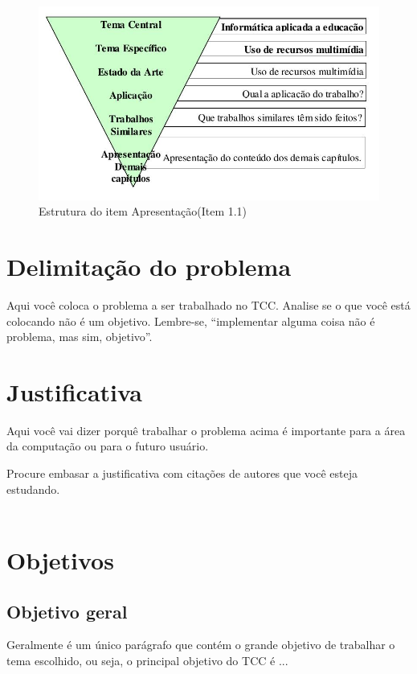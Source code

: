 \documentclass[pnumromarab, normaltoc, a4paper, 12pt]{abnt-unochapeco}
\begin{document}
\begin{figure}[hbtp]
  \begin{center}
  \caption{Estrutura do item Apresentação(Item 1.1)}
  \includegraphics[width=150mm]{images/imagem1.jpeg}
  \end{center}
\end{figure}

\section{Delimitação do problema}
Aqui você coloca o problema a ser trabalhado no TCC. Analise se o que você está
colocando não é um objetivo. Lembre-se, ``implementar alguma coisa não é
problema, mas sim, objetivo''.

\section{Justificativa}
Aqui você vai dizer porquê trabalhar o problema acima é importante para a área
da computação ou para o futuro usuário.

Procure embasar a justificativa com citações de autores que você esteja
estudando.\\
\\

\section{Objetivos}
\subsection{Objetivo geral}
Geralmente é um único parágrafo que contém o grande objetivo de trabalhar o tema
escolhido, ou seja, o principal objetivo do TCC é ...
\end{document}
